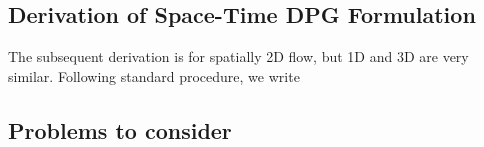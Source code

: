\documentclass[Proposal.tex]{subfiles}
\begin{document}
\subsection{Derivation of Space-Time DPG Formulation}
The subsequent derivation is for spatially 2D flow, but 1D and 3D are very similar.
Following standard procedure, we write

\subsection{Problems to consider}
\end{document}
